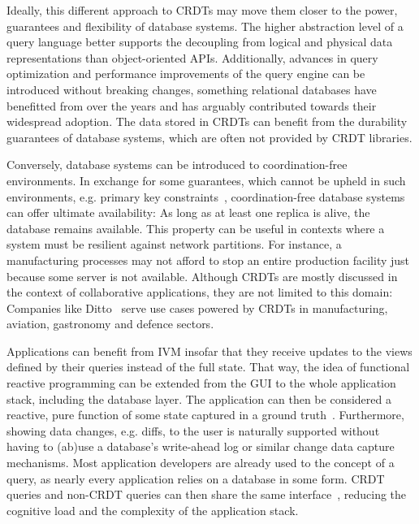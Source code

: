 Ideally, this different approach to \acp{CRDT} may move them closer to the power,
guarantees and flexibility of database systems.
The higher abstraction level of a query language better supports the decoupling
from logical and physical data representations than object-oriented \acp{API}.
Additionally, advances in query optimization and performance improvements
of the query engine can be introduced without breaking changes,
something relational databases have benefitted from over the years and
has arguably contributed towards their widespread adoption.
The data stored in \acp{CRDT} can benefit from the durability guarantees of
database systems, which are often not provided by \ac{CRDT} libraries.


Conversely, database systems can be introduced to coordination-free environments.
In exchange for some guarantees, which cannot be upheld in such environments,
e.g. primary key constraints~\cite{bailis2014coordination},
coordination-free database systems can offer ultimate availability:
As long as at least one replica is alive, the database remains available.
This property can be useful in contexts where a system must be resilient
against network partitions.
For instance, a manufacturing processes may not afford to stop an entire
production facility just because some server is not available.
Although \acp{CRDT} are mostly discussed in the context of collaborative
applications, they are not limited to this domain:
Companies like Ditto~\cite{ditto} serve use cases powered by \acp{CRDT}
in manufacturing, aviation, gastronomy and defence sectors.

Applications can benefit from \ac{IVM} insofar that they receive updates
to the views defined by their queries instead of the full state.
That way, the idea of functional reactive programming can be extended from
the \ac{GUI} to the whole application stack, including the database layer.
The application can then be considered a reactive, pure function
of some state captured in a ground truth~\cite{litt2023riffle}.
Furthermore, showing data changes, e.g. diffs, to the user is naturally supported
without having to (ab)use a database's write-ahead log or similar change
data capture mechanisms.
Most application developers are already used to the concept of a query,
as nearly every application relies on a database in some form.
\ac{CRDT} queries and non-\ac{CRDT} queries can then share the
same interface~\cite{litt2023riffle},
reducing the cognitive load and the complexity of the application stack.

